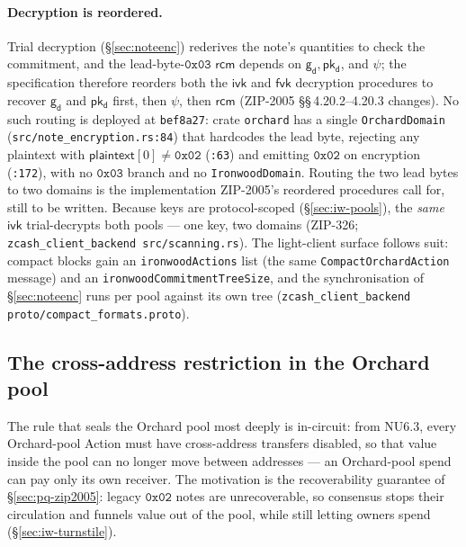 \documentclass[11pt,a4paper]{article}
\theoremstyle{definition}
\newcommand{\ivk}{\ensuremath{\mathsf{ivk}}}
\newcommand{\fvk}{\ensuremath{\mathsf{fvk}}}
\newcommand{\pkd}{\ensuremath{\mathsf{pk_d}}}
\newcommand{\gd}{\ensuremath{\mathsf{g_d}}}
\newcommand{\rcm}{\ensuremath{\mathsf{rcm}}}
\begin{document}
\paragraph{Decryption is reordered.} Trial decryption
(\S\ref{sec:noteenc}) rederives the note's quantities to check the
commitment, and the lead-byte-$\mathtt{0x03}$ $\rcm$ depends on $\gd, \pkd$,
and $\psi$; the specification therefore reorders both the $\ivk$ and $\fvk$
decryption procedures to recover $\gd$ and $\pkd$ first, then $\psi$, then
$\rcm$ (ZIP-2005 \S\S\,4.20.2--4.20.3 changes). No such routing is deployed
at \texttt{bef8a27}: crate \texttt{orchard} has a single \texttt{OrchardDomain}
(\texttt{src/note\_encryption.rs:84}) that hardcodes the lead byte, rejecting
any plaintext with $\mathsf{plaintext}[0] \ne \mathtt{0x02}$ (\texttt{:63})
and emitting $\mathtt{0x02}$ on encryption (\texttt{:172}), with no
$\mathtt{0x03}$ branch and no \texttt{IronwoodDomain}. Routing the two lead
bytes to two domains is the implementation ZIP-2005's reordered procedures
call for, still to be written. Because keys are protocol-scoped
(\S\ref{sec:iw-pools}), the \emph{same} $\ivk$ trial-decrypts both pools ---
one key, two domains (ZIP-326; \texttt{zcash\_client\_backend
src/scanning.rs}). The light-client surface follows suit: compact blocks
gain an \texttt{ironwoodActions} list (the same
\texttt{CompactOrchardAction} message) and an
\texttt{ironwoodCommitmentTreeSize}, and the synchronisation of
\S\ref{sec:noteenc} runs per pool against its own tree
(\texttt{zcash\_client\_backend proto/compact\_formats.proto}).

\subsection{The cross-address restriction in the Orchard
pool}\label{sec:iw-cross}

The rule that seals the Orchard pool most deeply is in-circuit: from NU6.3,
every Orchard-pool Action must have cross-address transfers disabled, so
that value inside the pool can no longer move between addresses --- an
Orchard-pool spend can pay only its own receiver. The motivation is the
recoverability guarantee of \S\ref{sec:pq-zip2005}: legacy $\mathtt{0x02}$
notes are unrecoverable, so consensus stops their circulation and funnels
value out of the pool, while still letting owners spend
(\S\ref{sec:iw-turnstile}).
\end{document}
